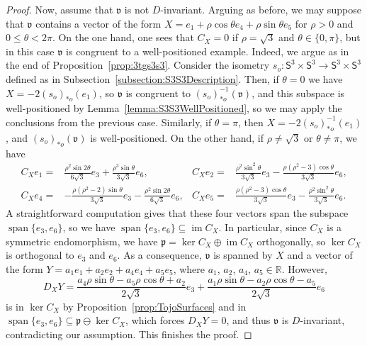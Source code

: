 \documentclass[11pt,a4paper,final]{amsart}
\newcommand{\g}{\mathfrak}
\newcommand{\R}{\mathbb{R}}
\newcommand{\vecspan}{\operatorname{span}}
\theoremstyle{definition}
\begin{document}
\begin{proof}
	Now, assume that $\g{v}$ is not $D$-invariant.
	Arguing as before, we may suppose that $\g{v}$ contains a vector of the form $X=e_{1}+\rho \cos \theta e_{4} + \rho \sin \theta e_{5}$ for $\rho > 0$ and $0 \leq \theta < 2 \pi$.
	On the one hand, one sees that $C_{X}=0$ if $\rho=\sqrt{3}$ and $\theta\in\{0,\pi\}$, but in this case $\g{v}$ is congruent to a well-positioned example.
	Indeed, we argue as in the end of Proposition~\ref{prop:3tgs3s3}.
	Consider the isometry $s_o\colon \mathsf{S}^{3}\times\mathsf{S}^{3}\to\mathsf{S}^{3}\times\mathsf{S}^{3}$ defined as in Subsection~\ref{subsection:S3S3Description}.
	Then, if $\theta=0$ we have $X=-2 (s_{o})_{*o}(e_{1})$, so $\g{v}$ is congruent to $(s_o)_{*o}^{-1}(\g{v})$, and this subspace is well-positioned by Lemma~\ref{lemma:S3S3WellPositioned}, so we may apply the conclusions from the previous case.
	Similarly, if $\theta=\pi$, then $X=-2(s_{o})^{-1}_{*o}(e_{1})$, and $(s_o)_{*o}(\g{v})$ is well-positioned.
	On the other hand, if $\rho \neq \sqrt{3}$ or $\theta\neq \pi$, we have
	\begin{align*}
		C_{X}e_{1}={}&\frac{\rho^{2}\sin 2\theta}{6\sqrt{3}}e_{3}+\frac{\rho^{3}\sin\theta}{3\sqrt{3}}e_{6}, & 
		C_{X}e_{2}={}&\frac{\rho ^2 \sin ^2\theta }{3 \sqrt{3}} e_{3}-\frac{\rho  \left(\rho ^2-3\right) \cos \theta }{3 \sqrt{3}}e_{6}, \\
		C_{X}e_{4}={}&-\frac{\rho  \left(\rho ^2-2\right) \sin\theta }{3 \sqrt{3}}e_{3}-\frac{\rho ^2 \sin 2 \theta }{6 \sqrt{3}}e_{6}, &
		C_{X}e_{5}={}&\frac{\rho  \left(\rho ^2-3\right) \cos\theta}{3 \sqrt{3}}e_{3}-\frac{\rho ^2 \sin ^2 \theta }{3 \sqrt{3}}e_{6}.
	\end{align*}
	A straightforward computation gives that these four vectors span the subspace $\vecspan\{e_{3},e_{6}\}$, so we have $\vecspan\{e_{3},e_{6}\}\subseteq \operatorname{im}C_{X}$.
	In particular, since $C_{X}$ is a symmetric endomorphism, we have $\g{p}=\ker C_{X}\oplus \operatorname{im}C_{X}$ orthogonally, so $\ker C_{X}$ is orthogonal to $e_{3}$ and $e_{6}$.
	As a consequence, $\g{v}$ is spanned by $X$ and a vector of the form $Y=a_{1}e_{1}+a_{2}e_{2}+a_{4}e_{4}+a_{5}e_{5}$,
	where $a_{1}$, $a_{2}$, $a_{4}$, $a_{5}\in\R$.
	However,
	\[
		D_X Y=\frac{a_4 \rho  \sin \theta -a_5 \rho  \cos
			\theta +a_2}{2 \sqrt{3}} e_{3}+\frac{a_1 \rho  \sin \theta -a_2 \rho  \cos
			\theta -a_5}{2 \sqrt{3}}e_{6}
	\]
	is in $\ker C_{X}$ by Proposition~\ref{prop:TojoSurfaces} and in $\vecspan\{e_{3},e_{6}\}\subseteq \g{p}\ominus\ker C_{X}$, which forces $D_X Y=0$, and thus $\g{v}$ is $D$-invariant, contradicting our assumption.
	This finishes the proof. \qedhere
\end{proof}
\end{document}
